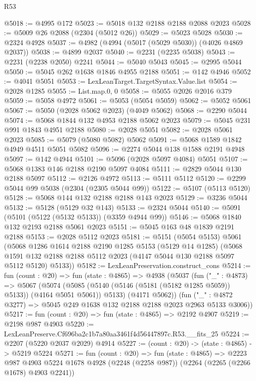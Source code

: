 \begin{lexlean}{R53}
\begin{coremodule}
@5018 := @4995 @172
@5023 := @5018 @132 @2188 @2188 @2088 @2023
@5028 := @5009 @26 @2088 (@2304 (@5012 @26))
@5029 := @5023 @5028
@5030 := @2324 @4928
@5037 := @4982 (@4994 (@5017 (@5029 @5030)) (@4026 @4869 @2037))
@5038 := @4899 @2037
@5040 := @2231 (@2235 @5038)
@5043 := @2231 (@2238 @2050) @2241
@5044 := @5040 @5043
@5045 := @2995 @5044
@5050 := @5045 @262 @1638 @1846 @4955 @2188
@5051 := @142 @4946
@5052 := @4041 @5051
@5053 := LexLeanTarget.TargetSyntax.Value.list
@5054 := @2028 @1285
@5055 := List.map.{0, 0}
@5058 := @5055 @2026 @2016 @379
@5059 := @5058 @4972
@5061 := @5053 (@5054 @5059)
@5062 := @5052 @5061
@5067 := @5050 (@2028 @5062 @2023) (@4049 @5062)
@5068 := @2290 @5044
@5074 := @5068 @1844 @132 @4953 @2188 @5062 @2023
@5079 := @5045 @231 @991 @1843 @4951 @2188
@5080 := @2028 @5051
@5082 := @2028 @5061 @2023
@5085 := @5079 (@5080 @5082) @5062
@5091 := @5068 @1589 @1842 @4949 @4511 @5051 @5082
@5096 := @2274 @5044 @138 @1588 @2191 @4948
@5097 := @142 @4944
@5101 := @5096 (@2028 @5097 @4084) @5051
@5107 := @5068 @1383 @146 @2188 @2190 @5097 @4084
@5111 := @2829 @5044 @130 @2188 @5097
@5112 := @2126 @4972
@5113 := @5111 @5112
@5120 := @2299 @5044 @99 @5038 (@2304 (@2305 @5044 @99))
@5122 := @5107 (@5113 @5120)
@5128 := @5068 @144 @132 @2188 @2188 @143 @2023
@5129 := @3236 @5044
@5132 := @5128 (@5129 @32 @143)
@5133 := @2324 @5044
@5140 := @5091 (@5101 (@5122 (@5132 @5133)) (@3359 @4944 @99))
@5146 := @5068 @1840 @132 @2193 @2188 @5061 @2023
@5151 := @5045 @163 @48 @1839 @2191 @2188
@5153 := @2028 @5112 @2023
@5181 := @5151
    (@5054 @5153)
    @5061
    (@5068
      @1286
      @1614
      @2188
      @2190
      @1285
      @5153
      (@5129 @14 @1285)
      (@5068 @1591 @132 @2188 @2188 @5112 @2023 (@4147 @5044 @130 @2188 @5097 @5112 @5120) @5133))
@5182 := LexLeanPreservation.construct_cons
@5214 := fun (count : @20) =>
  fun (state : @4865) =>
  @4938
    (@5037
      (fun ("_" : @4873) =>
      @5067
        (@5074 (@5085 (@5140 (@5146 (@5181 (@5182 @1285 @5059)) @5133)) (@4164 @5051 @5061)) @5133)
        (@4171 @5062))
      (fun ("_" : @4872 @3277) => @5045 @249 @1638 @132 @2188 @2188 @2023 @2963 @5133 @3006))
@5217 := fun (count : @20) => fun (state : @4865) => @2192 @4907
@5219 := @2198 @987 @4903
@5220 := LexLeanPreserve.Cf696ba2c1b7a80aa3461f4d56447897c.R53.__fits_25
@5224 := @2207 (@5220 @2037 @2029) @4914
@5227 := (count : @20) -> (state : @4865) -> @5219 @5224
@5271 := fun (count : @20) =>
  fun (state : @4865) =>
  @2223
    @987
    @4903
    @5224
    @1678
    @4928
    (@2248 (@2258 @987))
    (@2264 (@2265 (@2266 @1678) @4903 @2241))

\end{coremodule}
\end{lexlean}
